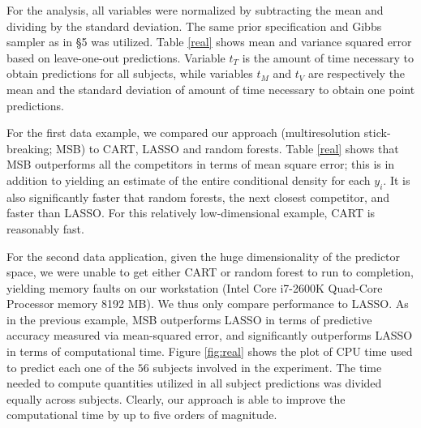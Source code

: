 For the analysis, all variables were normalized by subtracting the mean and dividing by the standard deviation. The same prior specification and Gibbs sampler as in \S 5 was  utilized. Table \ref{real} shows mean and variance squared error based on leave-one-out predictions. Variable $t_{T}$ is the amount of time necessary to obtain predictions for all subjects, while variables $t_M$ and $t_V$ are respectively the mean and the standard deviation of amount of time necessary to obtain one point predictions.

For the first data example, we compared our approach (multiresolution stick-breaking; MSB) to CART, LASSO and random forests. 
Table \ref{real} shows that MSB outperforms all the competitors in terms of mean square error; this is in addition to yielding an estimate of the entire conditional density for each $y_i$.  It is also significantly faster that random forests, the next closest competitor, and faster than LASSO.  For this relatively low-dimensional example, CART is reasonably fast.  

 
 For the second data application, given the huge dimensionality of the predictor space, we were unable to get either CART or random forest to run to completion, yielding memory faults on our workstation (Intel Core i7-2600K Quad-Core Processor memory 8192 MB).  We thus only compare performance to LASSO.  As in the previous example, MSB outperforms LASSO in terms of predictive accuracy measured via mean-squared error, and significantly outperforms LASSO in terms of computational time.  
Figure \ref{fig:real} shows the plot of CPU time used to predict each one of the $56$ subjects involved in the experiment. The time needed to compute quantities utilized in all subject predictions was divided equally across subjects. Clearly, our approach is able to improve the computational time by up to five orders of magnitude. 


